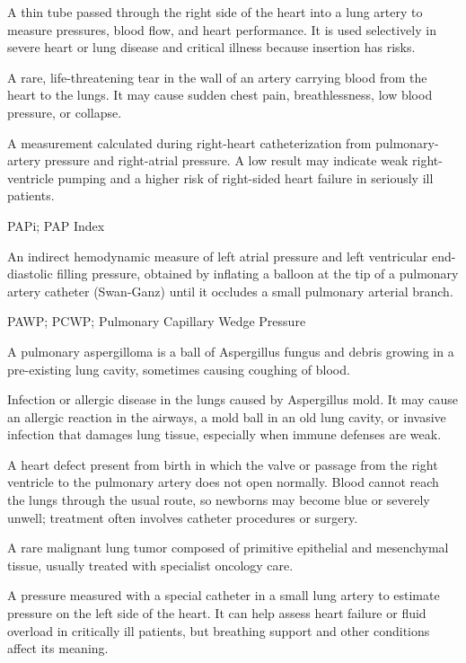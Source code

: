  A thin tube passed through the right side of the heart into a lung artery to measure pressures, blood flow, and heart performance. It is used selectively in severe heart or lung disease and critical illness because insertion has risks.

 A rare, life-threatening tear in the wall of an artery carrying blood from the heart to the lungs. It may cause sudden chest pain, breathlessness, low blood pressure, or collapse.

 A measurement calculated during right-heart catheterization from pulmonary-artery pressure and right-atrial pressure. A low result may indicate weak right-ventricle pumping and a higher risk of right-sided heart failure in seriously ill patients.

\synonyms
PAPi; PAP Index

 An indirect hemodynamic measure of left atrial pressure and left ventricular end-diastolic filling pressure, obtained by inflating a balloon at the tip of a pulmonary artery catheter (Swan-Ganz) until it occludes a small pulmonary arterial branch.

\synonyms
PAWP; PCWP; Pulmonary Capillary Wedge Pressure

 A pulmonary aspergilloma is a ball of Aspergillus fungus and debris growing in a pre-existing lung cavity, sometimes causing coughing of blood.

 Infection or allergic disease in the lungs caused
by Aspergillus mold. It may cause an allergic reaction in the airways, a mold ball
in an old lung cavity, or invasive infection that damages lung tissue, especially
when immune defenses are weak.

 A heart defect present from birth in which the valve or passage from the right ventricle to the pulmonary artery does not open normally. Blood cannot reach the lungs through the usual route, so newborns may become blue or severely unwell; treatment often involves catheter procedures or surgery.


 A rare malignant lung tumor composed of primitive epithelial and mesenchymal tissue, usually treated with specialist oncology care.

 A pressure measured with a special catheter in a small lung artery to estimate pressure on the left side of the heart. It can help assess heart failure or fluid overload in critically ill patients, but breathing support and other conditions affect its meaning.

